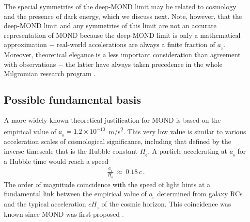 \documentclass[fleqn,usenatbib,useAMS,onecolumn]{mnras} %
\begin{document}
The special symmetries of the deep-MOND limit may be related to cosmology and the presence of dark energy, which we discuss next. Note, however, that the deep-MOND limit and any symmetries of this limit are not an accurate representation of MOND because the deep-MOND limit is only a mathematical approximation $-$ real-world accelerations are always a finite fraction of $a_{_0}$. Moreover, theoretical elegance is a less important consideration than agreement with observations $-$ the latter have always taken precedence in the whole Milgromian research program \citep[see also][]{Hossenfelder_2018}.



\subsection{Possible fundamental basis}
\label{Possible_fundamental_basis}

A more widely known theoretical justification for MOND is based on the empirical value of $a_{_0} = 1.2 \times 10^{-10}$~m/s\textsuperscript{2}. This very low value is similar to various acceleration scales of cosmological significance, including that defined by the inverse timescale that is the Hubble constant $H_{_0}$. A particle accelerating at $a_{_0}$ for a Hubble time would reach a speed 
\begin{eqnarray}
	\frac{a_{_0}}{H_{_0}} ~\approx~ 0.18 \, c \, .
	\label{a0_cH0_coincidence}
\end{eqnarray}
The order of magnitude coincidence with the speed of light hints at a fundamental link between the empirical value of $a_{_0}$ determined from galaxy RCs and the typical acceleration $cH_{_0}$ of the cosmic horizon. This coincidence was known since MOND was first proposed \citep[see the introduction to][]{Milgrom_1983}.
\end{document}
